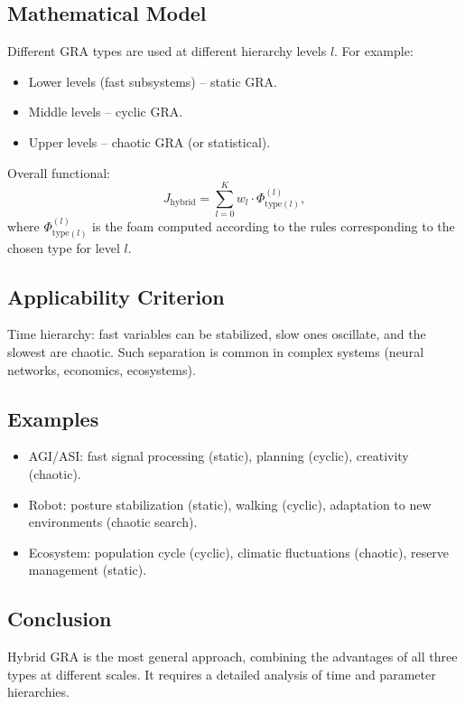 \documentclass[12pt,a4paper]{article}
\begin{document}
\subsection{Mathematical Model}

Different GRA types are used at different hierarchy levels $l$. For example:
\begin{itemize}
    \item Lower levels (fast subsystems) – static GRA.
    \item Middle levels – cyclic GRA.
    \item Upper levels – chaotic GRA (or statistical).
\end{itemize}

Overall functional:
\begin{equation}
    J_{\text{hybrid}} = \sum_{l=0}^{K} w_l \cdot \Phi_{\text{type}(l)}^{(l)},
\end{equation}
where $\Phi_{\text{type}(l)}^{(l)}$ is the foam computed according to the rules corresponding to the chosen type for level $l$.

\subsection{Applicability Criterion}

Time hierarchy: fast variables can be stabilized, slow ones oscillate, and the slowest are chaotic. Such separation is common in complex systems (neural networks, economics, ecosystems).

\subsection{Examples}
\begin{itemize}
    \item AGI/ASI: fast signal processing (static), planning (cyclic), creativity (chaotic).
    \item Robot: posture stabilization (static), walking (cyclic), adaptation to new environments (chaotic search).
    \item Ecosystem: population cycle (cyclic), climatic fluctuations (chaotic), reserve management (static).
\end{itemize}

\subsection{Conclusion}
Hybrid GRA is the most general approach, combining the advantages of all three types at different scales. It requires a detailed analysis of time and parameter hierarchies.
\end{document}
